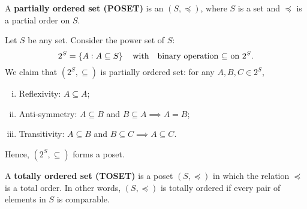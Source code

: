 \documentclass[11pt,openany]{article}
\begin{document}
\newpage
{}
\begin{note}
	A \colorbox{-red}{\textbf{partially ordered set (POSET)}} is an $(S,\preceq)$, where $S$ is a set and $\preceq$ is a partial order on $S$.
\end{note}
\begin{example*}
	Let $S$ be any set. Consider the power set of $S$: \[
	2^S=\set{A:A\subseteq S}\quad\text{with}\quad\text{binary operation $\subseteq$ on $2^S$}.
	\] We claim that $(2^S,\subseteq)$ is partially ordered set: for any $A,B,C\in 2^S$,\begin{enumerate}[(i)]
		\item Reflexivity: $A\subseteq A$;
		\item Anti-symmetry: $A\subseteq B$ and $B\subseteq A\implies A=B$;
		\item Transitivity: $A\subseteq B$ and $B\subseteq C\implies A\subseteq C$.
	\end{enumerate}
	Hence, $(2^S,\subseteq)$ forms a poset.
\end{example*}
\vfill
{}
\begin{note}
	A \colorbox{-red}{\textbf{totally ordered set (TOSET)}} is a poset $(S,\preceq)$ in which the relation $\preceq$ is a total order. In other words, $(S,\preceq)$ is totally ordered if every pair of elements in $S$ is comparable.
\end{note}
\end{document}
